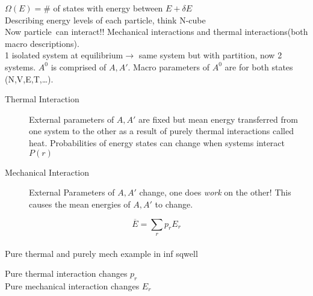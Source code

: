 \documentclass{article}
\def \pa {particle\ }
\begin{document}
\begin{lecture}
    $\Omega(E)=\#$ of states with energy between $E+\delta E$
    \\
    Describing energy levels of each particle, think N-cube
    \\
    Now \pa can interact!! Mechanical interactions and thermal interactions(both macro descriptions). 
    \\
    1 isolated system at equilibrium$\rightarrow$ same system but with partition, now 2 systems. $A^0$ is comprised of $A,A'$. Macro parameters of $A^0$ are for both states (N,V,E,T,\ldots).
    \\
    \begin{description}
        \item [Thermal Interaction] External parameters of $A,A'$ are fixed but mean energy transferred from one system to the other as a result of purely thermal interactions called heat. Probabilities of energy states can change when systems interact $P(r)$
        \item [Mechanical Interaction] External Parameters of $A,A'$ change, one does \emph{work} on the other! This causes the mean energies of $A,A'$ to change. 
    \end{description}
    $$\overline{E}=\sum_rp_rE_r$$
    \\
    Pure thermal and purely mech example in inf sqwell
\end{lecture}
\begin{lecture}[Jan 24]
    Pure thermal interaction changes $p_r$
    \\
    Pure mechanical interaction changes $E_r$
    
\end{lecture}
\end{document}
